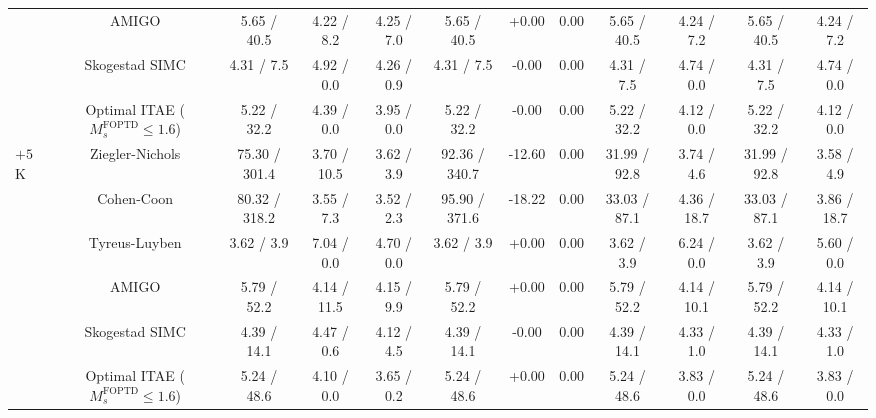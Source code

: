 \begin{table}[t]
{\begin{tabular}{lccccccccccc}
 & AMIGO & 5.65 / 40.5 & 4.22 / 8.2 & 4.25 / 7.0 & 5.65 / 40.5 & +0.00 & 0.00 & 5.65 / 40.5 & 4.24 / 7.2 & 5.65 / 40.5 & 4.24 / 7.2 \\
 & Skogestad SIMC & 4.31 / 7.5 & 4.92 / 0.0 & 4.26 / 0.9 & 4.31 / 7.5 & -0.00 & 0.00 & 4.31 / 7.5 & 4.74 / 0.0 & 4.31 / 7.5 & 4.74 / 0.0 \\
 & Optimal ITAE ($M_s^{\mathrm{FOPTD}} \leq 1.6$) & 5.22 / 32.2 & 4.39 / 0.0 & 3.95 / 0.0 & 5.22 / 32.2 & -0.00 & 0.00 & 5.22 / 32.2 & 4.12 / 0.0 & 5.22 / 32.2 & 4.12 / 0.0 \\
$+5$ K & Ziegler-Nichols & 75.30 / 301.4 & 3.70 / 10.5 & 3.62 / 3.9 & 92.36 / 340.7 & -12.60 & 0.00 & 31.99 / 92.8 & 3.74 / 4.6 & 31.99 / 92.8 & 3.58 / 4.9 \\
 & Cohen-Coon & 80.32 / 318.2 & 3.55 / 7.3 & 3.52 / 2.3 & 95.90 / 371.6 & -18.22 & 0.00 & 33.03 / 87.1 & 4.36 / 18.7 & 33.03 / 87.1 & 3.86 / 18.7 \\
 & Tyreus-Luyben & 3.62 / 3.9 & 7.04 / 0.0 & 4.70 / 0.0 & 3.62 / 3.9 & +0.00 & 0.00 & 3.62 / 3.9 & 6.24 / 0.0 & 3.62 / 3.9 & 5.60 / 0.0 \\
 & AMIGO & 5.79 / 52.2 & 4.14 / 11.5 & 4.15 / 9.9 & 5.79 / 52.2 & +0.00 & 0.00 & 5.79 / 52.2 & 4.14 / 10.1 & 5.79 / 52.2 & 4.14 / 10.1 \\
 & Skogestad SIMC & 4.39 / 14.1 & 4.47 / 0.6 & 4.12 / 4.5 & 4.39 / 14.1 & -0.00 & 0.00 & 4.39 / 14.1 & 4.33 / 1.0 & 4.39 / 14.1 & 4.33 / 1.0 \\
 & Optimal ITAE ($M_s^{\mathrm{FOPTD}} \leq 1.6$) & 5.24 / 48.6 & 4.10 / 0.0 & 3.65 / 0.2 & 5.24 / 48.6 & +0.00 & 0.00 & 5.24 / 48.6 & 3.83 / 0.0 & 5.24 / 48.6 & 3.83 / 0.0 \\
\bottomrule
\end{tabular}%
}
\end{table}
